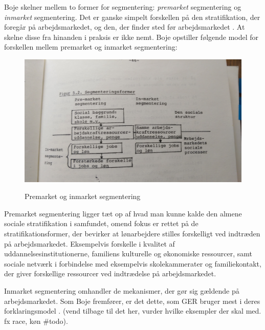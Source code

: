 Boje skelner mellem to former for segmentering: \emph{premarket} segmentering og \emph{inmarket} segmentering. Det er ganske simpelt forskellen på den stratifikation, der foregår på arbejdsmarkedet, og den, der finder sted før arbejdsmarkedet \parencite[46]{Boje1985}. At skelne disse fra hinanden i praksis er ikke nemt. Boje opstiller følgende model for forskellen mellem premarket og inmarket segmentering:
%
   \begin{figure}[H]
   \begin{centering}
   	\caption{Premarket og inmarket segmentering}
   	\includegraphics[width=\textwidth]{fig/Boje_premarket_inmarket.jpg}
   	\label{fig_premarketinmarket}
   \end{centering}
   \end{figure}   
%

Premarket segmentering ligger tæt op af hvad man kunne kalde den almene sociale stratifikation i samfundet, omend fokus er rettet på de stratifikationsformer, der bevirker at lønarbejdere stilles forskelligt ved indtræden på arbejdsmarkedet. 
Eksempelvis forskelle i kvalitet af uddannelsesinstitutionerne, familiens kulturelle og økonomiske ressourcer, samt  sociale netværk i forbindelse med eksempelvis skolekammerater og familiekontakt, der giver forskellige ressourcer ved indtrædelse på arbejdsmarkedet. 

Inmarket segmentering omhandler de mekanismer, der gør sig gældende på arbejdsmarkedet. Som Boje fremfører, er det dette, som GER bruger mest i deres forklaringsmodel \parencite[46]{Boje1985}.  (vend tilbage til det her, vurder hvilke eksempler der skal med. fx race, køn \#todo).

